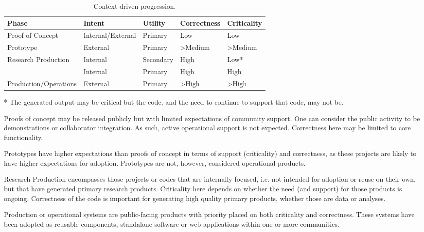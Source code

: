 \documentclass{article}
\begin{document}
\FloatBarrier
\begin{table}[!hbp]
\caption{Context-driven progression.}
\begin{tabularx}{\textwidth}{lXXXX}
\hline
\textbf{Phase} & \textbf{Intent} & \textbf{Utility} & \textbf{Correctness} & \textbf{Criticality} \\ \hline
Proof of Concept & Internal/External & Primary & Low & Low \\ \hline
Prototype & External & Primary & \textgreater Medium & \textgreater Medium \\ \hline
\multirow{2}{*}{Research Production} & Internal & Secondary & High & Low* \\ & Internal & Primary & High & High \\  \hline
Production/Operations & External & Primary & \textgreater High & \textgreater High \\ \hline
\end{tabularx}
\label{table4}
\begin{flushleft}
* The generated output may be critical but the code, and the need to continue to support that code, may not be.
\end{flushleft}
\end{table}

Proofs of concept may be released publicly but with limited expectations of community support. One can consider the public activity to be demonstrations or collaborator integration. As such, active operational support is not expected. Correctness here may be limited to core functionality. 
 
Prototypes have higher expectations than proofs of concept in terms of support (criticality) and correctness, as these projects are likely to have higher expectations for adoption. Prototypes are not, however, considered operational products.
 
Research Production encompasses those projects or codes that are internally focused, i.e. not intended for adoption or reuse on their own, but that have generated primary research products. Criticality here depends on whether the need (and support) for those products is ongoing. Correctness of the code is important for generating high quality primary products, whether those are data or analyses. 
 
Production or operational systems are public-facing products with priority placed on both criticality and correctness. These systems have been adopted as reusable components, standalone software or web applications within one or more communities. 
 
\end{document}
